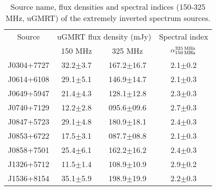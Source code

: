 \documentclass[proof]{WileyASNA-v1}
\begin{document}
\begin{table}[h!]
\centering
\caption{Source name, flux densities and spectral indices (150-325 MHz, uGMRT) of the extremely inverted spectrum sources.}
\begin{tabular}{cccc}
\hline

\multicolumn{1}{c}{Source}& \multicolumn{2}{c}{uGMRT flux density (mJy)} & \multicolumn{1}{c}{Spectral index} \\
  &  150 MHz & 325 MHz & $\alpha_{\rm 150\,MHz}^{\rm 325\,MHz}$\\
\hline
J0304+7727 & 32.2${\pm}3.7$ &167.2${\pm}$16.7 &2.1${\pm}$0.2\\
J0614+6108 &29.1${\pm}$5.1 &146.9${\pm}$14.7 &2.1${\pm}$0.3\\
J0649+5947 &21.4${\pm}$4.3 &128.1${\pm}$12.8 &2.3${\pm}$0.3\\
J0740+7129 &12.2${\pm}$2.8 &095.6${\pm}$09.6 &2.7${\pm}$0.3\\
J0847+5723 &29.1${\pm}$4.8 &180.9${\pm}$18.1 &2.4${\pm}$0.3\\
J0853+6722 &17.5${\pm}$3.1 &087.7${\pm}$08.8 &2.1${\pm}$0.3\\
J0858+7501 &25.4${\pm}$6.1 &162.2${\pm}$16.2 &2.4${\pm}$0.3\\
J1326+5712 &11.5${\pm}$1.4 &108.9${\pm}$10.9 &2.9${\pm}$0.2\\
J1536+8154 &35.1${\pm}$5.9 &198.9${\pm}$19.9 &2.2${\pm}$0.3\\ 

\end{tabular}
\end{table}
\end{document}
